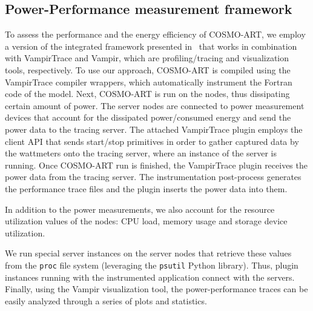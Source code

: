 \subsection{Power-Performance measurement framework}
\label{subsec:3.1}
To assess the  performance and the energy efficiency  of COSMO-ART, we
employ   a    version   of   the    integrated   framework   presented
in~\cite{energy13}  that  works in  combination  with VampirTrace  and
Vampir,   which  are   profiling/tracing   and  visualization   tools,
respectively.
To  use our  approach,  COSMO-ART is  compiled  using the  VampirTrace
compiler wrappers, which automatically  instrument the Fortran code of
the  model. Next,  COSMO-ART is  run  on the  nodes, thus  dissipating
certain  amount of  power.  The  server nodes  are connected  to power
measurement  devices that  account for  the  dissipated power/consumed
energy and  send the power data  to the tracing  server.  The attached
VampirTrace \pmlib plugin employs the client API that sends start/stop
primitives in order to gather captured data by the wattmeters onto the
tracing server,  where an  instance of the  \pmlib server  is running.
Once COSMO-ART run is finished, the VampirTrace \pmlib plugin receives
the  power   data  from  the  tracing   server.   The  instrumentation
post-process  generates the  performance  trace files  and the  \pmlib
plugin inserts the power data into them.

In  addition  to the  power  measurements,  we  also account  for  the
resource utilization values  of the nodes: CPU load,  memory usage and
storage device utilization. %

We  run special  \pmlib  server  instances on  the  server nodes  that
retrieve these  values from the \texttt{proc}  file system (leveraging
the  \texttt{psutil} Python library).   Thus, \pmlib  plugin instances
running  with the  instrumented  application connect  with the  \pmlib
servers.   Finally,   using  the   Vampir   visualization  tool,   the
power-performance traces  can be easily  analyzed through a  series of
plots and statistics.
